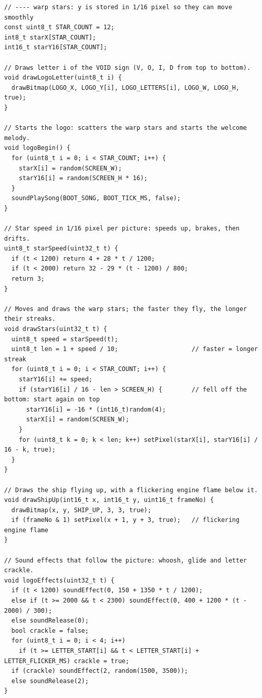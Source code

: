 \documentclass[11pt,a4paper]{article}
\begin{document}
\begin{latin}
\begin{lstlisting}[language=Arduino]
// ---- warp stars: y is stored in 1/16 pixel so they can move smoothly
const uint8_t STAR_COUNT = 12;
int8_t starX[STAR_COUNT];
int16_t starY16[STAR_COUNT];

// Draws letter i of the VOID sign (V, O, I, D from top to bottom).
void drawLogoLetter(uint8_t i) {
  drawBitmap(LOGO_X, LOGO_Y[i], LOGO_LETTERS[i], LOGO_W, LOGO_H, true);
}

// Starts the logo: scatters the warp stars and starts the welcome melody.
void logoBegin() {
  for (uint8_t i = 0; i < STAR_COUNT; i++) {
    starX[i] = random(SCREEN_W);
    starY16[i] = random(SCREEN_H * 16);
  }
  soundPlaySong(BOOT_SONG, BOOT_TICK_MS, false);
}

// Star speed in 1/16 pixel per picture: speeds up, brakes, then drifts.
uint8_t starSpeed(uint32_t t) {
  if (t < 1200) return 4 + 28 * t / 1200;
  if (t < 2000) return 32 - 29 * (t - 1200) / 800;
  return 3;
}

// Moves and draws the warp stars; the faster they fly, the longer their streaks.
void drawStars(uint32_t t) {
  uint8_t speed = starSpeed(t);
  uint8_t len = 1 + speed / 10;                    // faster = longer streak
  for (uint8_t i = 0; i < STAR_COUNT; i++) {
    starY16[i] += speed;
    if (starY16[i] / 16 - len > SCREEN_H) {        // fell off the bottom: start again on top
      starY16[i] = -16 * (int16_t)random(4);
      starX[i] = random(SCREEN_W);
    }
    for (uint8_t k = 0; k < len; k++) setPixel(starX[i], starY16[i] / 16 - k, true);
  }
}

// Draws the ship flying up, with a flickering engine flame below it.
void drawShipUp(int16_t x, int16_t y, uint16_t frameNo) {
  drawBitmap(x, y, SHIP_UP, 3, 3, true);
  if (frameNo & 1) setPixel(x + 1, y + 3, true);   // flickering engine flame
}

// Sound effects that follow the picture: whoosh, glide and letter crackle.
void logoEffects(uint32_t t) {
  if (t < 1200) soundEffect(0, 150 + 1350 * t / 1200);
  else if (t >= 2000 && t < 2300) soundEffect(0, 400 + 1200 * (t - 2000) / 300);
  else soundRelease(0);
  bool crackle = false;
  for (uint8_t i = 0; i < 4; i++)
    if (t >= LETTER_START[i] && t < LETTER_START[i] + LETTER_FLICKER_MS) crackle = true;
  if (crackle) soundEffect(2, random(1500, 3500));
  else soundRelease(2);
}


\end{lstlisting}
\end{latin}
\end{document}
